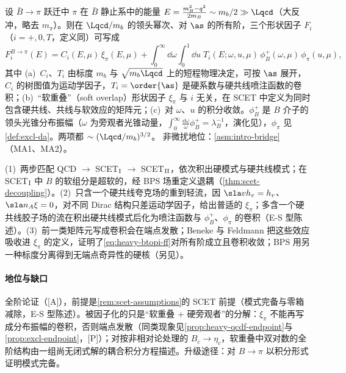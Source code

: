 \begin{proposition}\label{prop:heavy-btopi-ff}
设 $\bar B\to\pi$ 跃迁中 $\pi$ 在 $\bar B$ 静止系中的能量 $E=\frac{m_B^2-q^2}{2m_B}\sim m_b/2\gg\Lqcd$（大反冲，略去 $m_\pi$）。则在 $\Lqcd/m_b$ 的领头幂次、对 $\as$ 的所有阶，三个形状因子 $F_i$（$i=+,0,T$，定义同\cite{Beneke:2003pa}）可写成
\begin{equation}\label{eq:heavy-btopi-ff}
F_i^{B\to\pi}(E)=C_i(E,\mu)\,\xi_\pi(E,\mu)+\int_0^\infty\!\dd\omega\int_0^1\!\dd u\;T_i(E;\omega,u,\mu)\,\phi_B^+(\omega,\mu)\,\phi_\pi(u,\mu),
\end{equation}
其中 (a)~$C_i$、$T_i$ 由标度 $m_b$ 与 $\sqrt{m_b\Lqcd}$ 上的短程物理决定，可按 $\as$ 展开，$C_i$ 的树图值为运动学因子，$T_i=\order{\as}$ 是硬系数与硬共线喷注函数的卷积；(b)~“软重叠”（soft overlap）形状因子 $\xi_\pi$ 与 $i$ 无关，在 SCET 中定义为同时包含硬共线、共线与软效应的矩阵元；(c)~对 $\omega$、$u$ 的积分收敛。$\phi_B^+$ 是 $B$ 介子的领头光锥分布振幅（$\omega$ 为旁观者光锥动量，$\int_0^\infty\frac{\dd\omega}{\omega}\phi_B^+=\lambda_B^{-1}$\cite{Grozin:1996pq}，演化见\cite{Lange:2003ff}），$\phi_\pi$ 见\cref{def:excl-da}。两项都 $\sim(\Lqcd/m_b)^{3/2}$。
非微扰地位：\cref{asm:intro-bridge}（MA1、MA2）。
\end{proposition}

\begin{proofsketch}
(1)~两步匹配 QCD $\to$ SCET$_{\rm I}$ $\to$ SCET$_{\rm II}$，依次积出硬模式与硬共线模式；在 SCET$_{\rm I}$ 中 $B$ 的软组分是超软的，经 BPS 场重定义退耦（\cref{thm:scet-decoupling}）。(2)~只含一个硬共线夸克场的重到轻流，因 $\sla vh_v=h_v$、$\sla n_A\xi=0$，对不同 Dirac 结构只差运动学因子，给出普适的 $\xi_\pi$；多含一个硬共线胶子场的流在积出硬共线模式后化为喷注函数与 $\phi_B^+$、$\phi_\pi$ 的卷积（E-S 型陈述）。(3)~前一类矩阵元写成卷积会在端点发散；Beneke 与 Feldmann 把这些效应吸收进 $\xi_\pi$ 的定义，证明了\cref{eq:heavy-btopi-ff}对所有阶成立且卷积收敛\cite{Beneke:2003pa}；BPS 用另一种标度分离得到无端点奇异性的硬核\cite{Bauer:2002aj}（另见\cite{Hill:2002vw,Beneke:2005gs}）。
\end{proofsketch}

\paragraph{地位与缺口}
全阶论证（[A]），前提是\cref{rem:scet-assumptions}的 SCET 前提（模式完备与零箱减除，E-S 型陈述）。被因子化的只是“软重叠 + 硬旁观者”的分解：$\xi_\pi$ 不能再写成分布振幅的卷积，否则端点发散（同类现象见\cref{prop:heavy-qcdf-endpoint}与\cref{prop:excl-endpoint}，[P]）；对按非相对论处理的 $B_c\to\eta_c$，软重叠中双对数的全阶结构由一组尚无闭式解的耦合积分方程描述\cite{Bell:2024bxg}。升级途径：对 $B\to\pi$ 以积分形式证明模式完备。

